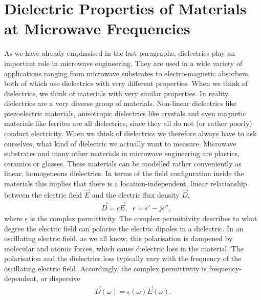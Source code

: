 \section{Dielectric Properties of Materials at Microwave Frequencies}
As we have already emphasised in the last paragraphs, dielectrics play an important role in microwave engineering. They are used in a wide variety of applications ranging from microwave substrates to electro-magnetic absorbers, both of which use dielectrics with very different properties. When we think of dielectrics, we think of materials with very similar properties. In reality, dielectrics are a very diverse group of materials. Non-linear dielectrics like piezoelectric materials, anisotropic dielectrics like crystals and even magnetic materials like ferrites are all dielectrics, since they all do not (or rather poorly) conduct electricity. When we think of dielectrics we therefore always have to ask ourselves, what kind of dielectric we actually want to measure. Microwave substrates and many other materials in microwave engineering are plastics, ceramics or glasses. These materials can be modelled rather conveniently as linear, homogeneous dielectrics. In terms of the field configuration inside the materials this implies that there is a location-independent, linear relationship between the electric field $\vec{E}$ and the electric flux density $\vec{D}$,
\begin{align*}
&\vec{D}=\underline{\epsilon}\vec{E}\text{,} &\underline{\epsilon}=\epsilon'-j\epsilon''\text{,}
\end{align*}
where $\underline{\epsilon}$ is the complex permittivity. The complex permittivity describes to what degree the electric field can polarise the electric dipoles in a dielectric. In an oscillating electric field, as we all know, this polarisation is dampened by molecular and atomic forces, which cause dielectric loss in the material. The polarisation and the dielectrics loss typically vary with the frequency of the oscillating electric field. Accordingly, the complex permittivity is frequency-dependent, or dispersive
\begin{align*}
\vec{D}(\omega)=\underline{\epsilon}(\omega)\vec{E}(\omega)\text{.}
\end{align*}
